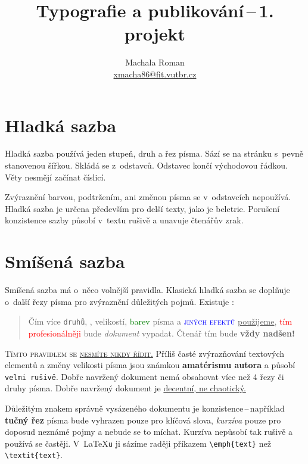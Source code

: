 \documentclass[hidelinks, twocolumn, 10pt, a4paper]{article}[24.02.2022]
\title{Typografie a publikování\,--\,1. projekt}
\author{Machala Roman \\ \href{mailto:xmacha86@fit.vutbr.cz}{xmacha86@fit.vutbr.cz}}
\date{} %
\begin{document}
   
    \maketitle 
    
        \section{Hladká sazba}
            Hladká sazba používá jeden stupeň, druh a řez písma. Sází se na stránku s~pevně stanovenou šířkou. Skládá se z~odstavců. Odstavec končí východovou řádkou. Věty nesmějí začínat číslicí.
            
            Zvýraznění barvou, podtržením, ani změnou písma se v~odstavcích nepoužívá. Hladká sazba je určena především pro delší texty, jako je beletrie. Porušení konzistence sazby působí v~textu rušivě a unavuje čtenářův zrak.
        \section{Smíšená sazba}
            Smíšená sazba má o~něco volnější pravidla. Klasická hladká sazba se doplňuje o~další řezy písma pro zvýraznění důležitých pojmů. Existuje : 
            
            \begin{quotation}
                Čím více \texttt{druhů}, {\selectfont{řezů}}, {\tiny velikostí}, \textcolor{green}{barev} písma a \textsc{\textcolor{blue}{jiných efektů}} \underline{použijeme}, \textcolor{red}{tím profesionálněji} bude \emph{dokument} vypadat. Čtenář tím bude \textbf{{\Huge{vždy nadšen!}}}
            \end{quotation}
            
            \textsc{Tímto pravidlem se \underline{nesmíte nikdy řídit.}} Příliš časté zvýrazňování textových elementů a změny velikosti písma jsou známkou \textbf{amatérismu autora} a působí \texttt{velmi rušivě}. Dobře navržený dokument nemá obsahovat více než 4 řezy či druhy písma. Dobře navržený dokument je \underline{decentní, ne chaotický.}
    
            Důležitým znakem správně vysázeného dokumentu je konzistence\,--\,například \textbf{tučný řez} písma bude vyhrazen pouze pro klíčová slova, \emph{kurzíva} pouze pro doposud neznámé pojmy a nebude se to míchat. Kurzíva nepůsobí tak rušivě a používá se častěji. V~\LaTeX\verb|u| ji sázíme raději příkazem \verb|\emph{text}| než \verb|\textit{text}|.
            
\end{document}
